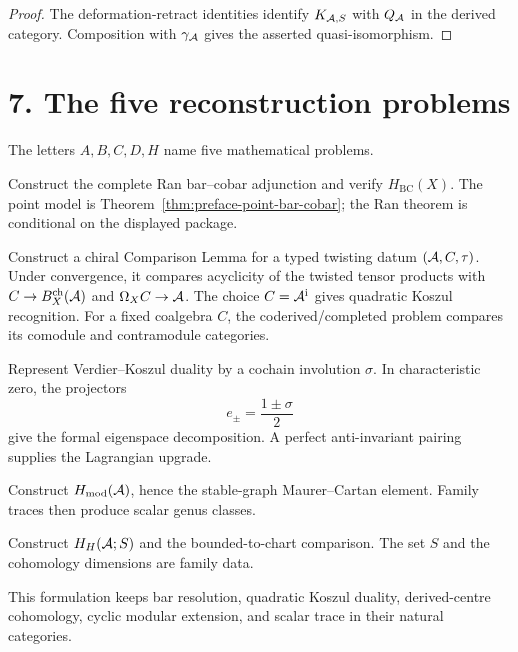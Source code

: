\begin{proof}
The deformation-retract identities identify
\(K_{\mathcal{A},S}\) with \(Q_{\mathcal{A}}\) in the derived category.
Composition with \(\gamma_{\mathcal{A}}\) gives the asserted
quasi-isomorphism.
\end{proof}

\section*{7.  The five reconstruction problems}

The letters \(A,B,C,D,H\) name five mathematical problems.

\begin{description}[leftmargin=2.8em,style=nextline]
\item[\(\mathbf A\).]
Construct the complete Ran bar--cobar adjunction and verify
\(H_{\mathrm{BC}}(X)\).  The point model is
Theorem~\ref{thm:preface-point-bar-cobar}; the Ran theorem is
conditional on the displayed package.

\item[\(\mathbf B\).]
Construct a chiral Comparison Lemma for a typed twisting datum
\((\mathcal{A},C,\tau)\).  Under convergence, it compares acyclicity of the
twisted tensor products with
\(C\to B_X^{\mathrm{ch}}(\mathcal{A})\) and
\(\Omega_X C\to\mathcal{A}\).  The choice \(C=\mathcal{A}^{\mathrm i}\) gives
quadratic Koszul recognition.  For a fixed coalgebra \(C\), the
coderived/completed problem compares its comodule and contramodule
categories.

\item[\(\mathbf C\).]
Represent Verdier--Koszul duality by a cochain involution
\(\sigma\).  In characteristic zero, the projectors
\[
 e_\pm=\frac{1\pm\sigma}{2}
\]
give the formal eigenspace decomposition.  A perfect
anti-invariant pairing supplies the Lagrangian upgrade.

\item[\(\mathbf D\).]
Construct \(H_{\mathrm{mod}}(\mathcal{A})\), hence the stable-graph
Maurer--Cartan element.  Family traces then produce scalar genus
classes.

\item[\(\mathbf H\).]
Construct \(H_H(\mathcal{A};S)\) and the bounded-to-chart comparison.
The set \(S\) and the cohomology dimensions are family data.
\end{description}

This formulation keeps bar resolution, quadratic Koszul duality,
derived-centre cohomology, cyclic modular extension, and scalar trace
in their natural categories.

